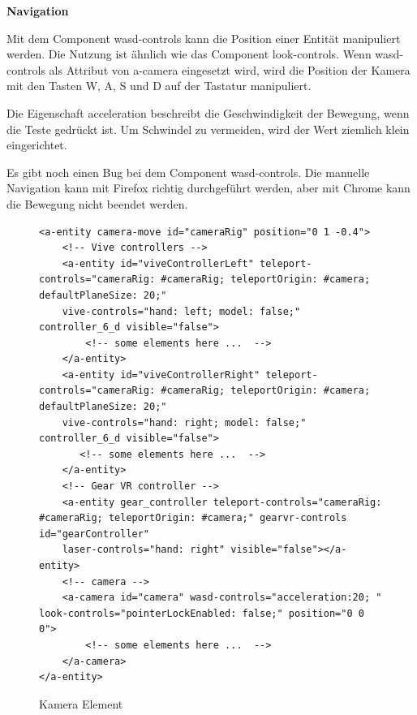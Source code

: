   \vspace{1em}
  \noindent
  \textbf{Navigation}
  \vspace{1em}
  
  \noindent
  Mit dem Component {\selectfont wasd-controls} kann die Position einer Entität manipuliert werden. Die Nutzung ist ähnlich wie das Component {\selectfont look-controls}. Wenn {\selectfont wasd-controls} als Attribut von {\selectfont a-camera} eingesetzt wird, wird die Position der Kamera mit den Tasten W, A, S und D auf der Tastatur manipuliert.
  
  Die Eigenschaft {\selectfont acceleration} beschreibt die Geschwindigkeit der Bewegung, wenn die Teste gedrückt ist. Um Schwindel zu vermeiden, wird der Wert ziemlich klein eingerichtet.
  
  Es gibt noch einen Bug bei dem Component {\selectfont wasd-controls}. Die manuelle Navigation kann mit Firefox richtig durchgeführt werden, aber mit Chrome kann die Bewegung nicht beendet werden.
  
\begin{figure}[ht]
\vspace*{1em}
\centering
\caption[Kamera Element]{Kamera Element}
\begin{lstlisting}[language=HTML5, style=htmlcssjs]
<a-entity camera-move id="cameraRig" position="0 1 -0.4">
    <!-- Vive controllers -->
    <a-entity id="viveControllerLeft" teleport-controls="cameraRig: #cameraRig; teleportOrigin: #camera; defaultPlaneSize: 20;" 
    vive-controls="hand: left; model: false;" controller_6_d visible="false">
        <!-- some elements here ...  -->
    </a-entity>
    <a-entity id="viveControllerRight" teleport-controls="cameraRig: #cameraRig; teleportOrigin: #camera; defaultPlaneSize: 20;" 
    vive-controls="hand: right; model: false;" controller_6_d visible="false">
       <!-- some elements here ...  -->
    </a-entity>
    <!-- Gear VR controller -->
    <a-entity gear_controller teleport-controls="cameraRig: #cameraRig; teleportOrigin: #camera;" gearvr-controls id="gearController" 
    laser-controls="hand: right" visible="false"></a-entity>
    <!-- camera -->
    <a-camera id="camera" wasd-controls="acceleration:20; " look-controls="pointerLockEnabled: false;" position="0 0 0">
        <!-- some elements here ...  -->
    </a-camera>
</a-entity>
\end{lstlisting}
\label{fig:cameraHtml} 
\end{figure}
  

